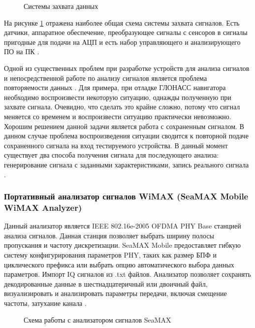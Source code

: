\begin{figure}[H]
\caption{Системы захвата данных}
\label{pic_acq}
\end{figure}

На рисунке \ref{pic_acq} отражена наиболее общая схема системы захвата сигналов. Есть датчики, аппаратное обеспечение,
преобразующее сигналы с сенсоров в сигналы пригодные для подачи на АЦП и есть набор управляющего и анализирующего ПО
на ПК \cite{ni_acq}.

Одной из существенных проблем при разработке устройств для анализа сигналов и непосредственной работе по анализу сигналов
является проблема повторяемости данных \cite{ni_article}. Для примера, при отладке ГЛОНАСС навигатора необходимо 
воспроизвести некоторую ситуацию, однажды полученную при захвате сигнала. Очевидно, что сделать это крайне сложно, потому
что сигнал меняется со временем и воспроизвести ситуацию практически невозможно. Хорошим решением данной задачи является
работа с сохраненным сигналом. В данном случае проблема воспроизведения ситуации сводится к повторной подаче сохраненного
сигнала на вход тестируемого устройства. В данный момент существует два способа получения сигнала для последующего анализа:
генерирование сигнала с заданными характеристиками, запись реального сигнала \cite{ni_article}.

\subsubsection{Портативный анализатор сигналов WiMAX (SeaMAX Mobile WiMAX Analyzer)}
Данный анализатор является IEEE 802.16e-2005 OFDMA PHY Base станцией анализа сигналов. Данная станция 
позволяет выбрать ширину полосы пропускания и частоту дискретизации.
SeaMAX Mobile предоставляет гибкую систему конфигурирования параметров PHY, таких как
размер БПФ и циклического префикса или выбрать опцию автоматического выбора данных параметров. Импорт IQ сигналов
из .txt файлов. Анализатор позволяет сохранять декодированные данные в шестнадцатеричный или двоичный файл,
визуализировать и анализировать параметры передачи, включая смещение частоты, затухание канала
\cite{seamax_overview, seamax_pdf}.

\begin{figure}[H]
\caption{Схема работы с анализатором сигналов SeaMAX}
\label{pic:seamax}
\end{figure}

